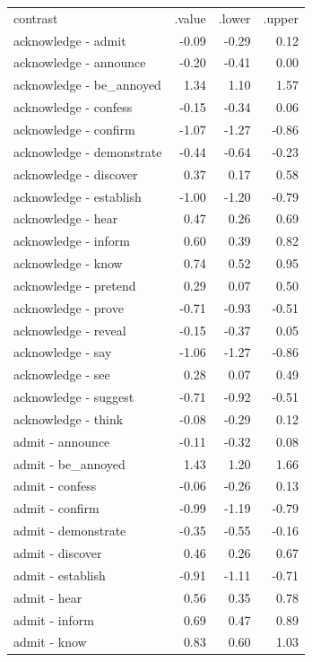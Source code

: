 \begin{longtable}{lrrr}
 contrast & .value & .lower & .upper \\ 
 acknowledge - admit & -0.09 & -0.29 & 0.12 \\ 
  acknowledge - announce & -0.20 & -0.41 & 0.00 \\ 
  acknowledge - be_annoyed & 1.34 & 1.10 & 1.57 \\ 
  acknowledge - confess & -0.15 & -0.34 & 0.06 \\ 
  acknowledge - confirm & -1.07 & -1.27 & -0.86 \\ 
  acknowledge - demonstrate & -0.44 & -0.64 & -0.23 \\ 
  acknowledge - discover & 0.37 & 0.17 & 0.58 \\ 
  acknowledge - establish & -1.00 & -1.20 & -0.79 \\ 
  acknowledge - hear & 0.47 & 0.26 & 0.69 \\ 
  acknowledge - inform & 0.60 & 0.39 & 0.82 \\ 
  acknowledge - know & 0.74 & 0.52 & 0.95 \\ 
  acknowledge - pretend & 0.29 & 0.07 & 0.50 \\ 
  acknowledge - prove & -0.71 & -0.93 & -0.51 \\ 
  acknowledge - reveal & -0.15 & -0.37 & 0.05 \\ 
  acknowledge - say & -1.06 & -1.27 & -0.86 \\ 
  acknowledge - see & 0.28 & 0.07 & 0.49 \\ 
  acknowledge - suggest & -0.71 & -0.92 & -0.51 \\ 
  acknowledge - think & -0.08 & -0.29 & 0.12 \\ 
  admit - announce & -0.11 & -0.32 & 0.08 \\ 
  admit - be_annoyed & 1.43 & 1.20 & 1.66 \\ 
  admit - confess & -0.06 & -0.26 & 0.13 \\ 
  admit - confirm & -0.99 & -1.19 & -0.79 \\ 
  admit - demonstrate & -0.35 & -0.55 & -0.16 \\ 
  admit - discover & 0.46 & 0.26 & 0.67 \\ 
  admit - establish & -0.91 & -1.11 & -0.71 \\ 
  admit - hear & 0.56 & 0.35 & 0.78 \\ 
  admit - inform & 0.69 & 0.47 & 0.89 \\ 
  admit - know & 0.83 & 0.60 & 1.03 \\ 

\end{longtable}
